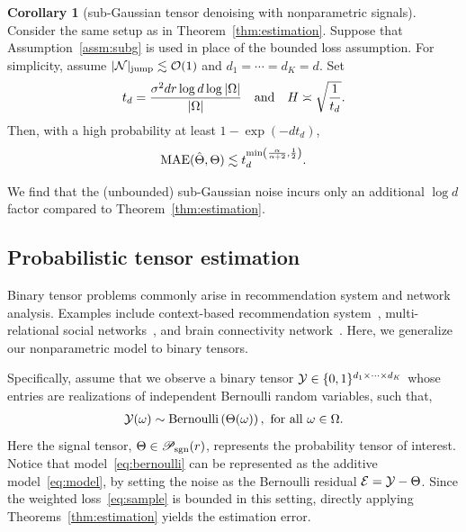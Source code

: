 \documentclass[twoside,11pt]{article}
\theoremstyle{definition}
\newtheorem{cor}{Corollary}
\def\caliP{\mathscr{P}_{\textup{sgn}}}
\begin{document}
\begin{cor}[sub-Gaussian tensor denoising with nonparametric signals]\label{thm:unbddno1}
Consider the same setup as in Theorem~\ref{thm:estimation}. Suppose that Assumption~\ref{assm:subg} is used in place of the bounded loss assumption. For simplicity, assume $|\mathcal{N}|_{\text{jump}}\lesssim \mathcal{O}(1)$ and $d_1=\cdots =d_K=d$. Set
\[
t_d ={ \sigma^2d r\log d \log |\Omega|\over |\Omega|} \quad \text{and}\quad H\asymp \sqrt{1\over t_d}.
\] 
Then, with a high probability at least $1-\exp(-d t_d)$,
\begin{equation}\label{eq:bound3}
\textup{MAE}(\hat \Theta, \Theta)\lesssim t_d^{\min\left({\alpha\over \alpha+2}, {1\over 2}\right)}.
\end{equation}
\end{cor}
We find that the (unbounded) sub-Gaussian noise incurs only an additional $\log d$ factor compared to Theorem~\ref{thm:estimation}. 



\subsection{Probabilistic tensor estimation}
Binary tensor problems commonly arise in recommendation system and network analysis. Examples include context-based recommendation system~\citep{adomavicius2011context}, multi-relational social networks~\citep{nickel2011three}, and brain connectivity network~\citep{wang2019common}. Here, we generalize our nonparametric model to binary tensors.

Specifically, assume that we observe a binary tensor $\mathcal{Y}\in\{0,1\}^{d_1\times \cdots\times d_K}$  
whose entries are realizations of independent Bernoulli random variables, such that,
\begin{align}\label{eq:bernoulli}
    \mathcal{Y}(\omega)\sim \text{Bernoulli}\left(\Theta(\omega)\right), \ \text{for all}\ \omega\in \Omega. 
\end{align}
Here the signal tensor, $\Theta\in\caliP(r)$, represents the probability tensor of interest. Notice that model~\eqref{eq:bernoulli} can be represented as the additive model~\eqref{eq:model}, by setting the noise as the Bernoulli residual $\mathcal{E}=\mathcal{Y}-\Theta$. Since the weighted loss~\eqref{eq:sample} is bounded in this setting, directly applying Theorems~\ref{thm:estimation} yields the estimation error.
\end{document}
